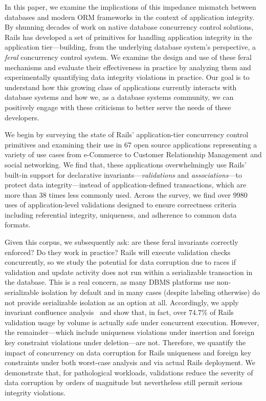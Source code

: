 In this paper, we examine the implications of this impedance mismatch
between databases and modern ORM frameworks in the context of
application integrity. By shunning decades of work on native database
concurrency control solutions, Rails has developed a set of primitives
for handling application integrity in the application tier---building,
from the underlying database system's perspective, a \textit{feral}
concurrency control system. We examine the design and use of these
feral mechanisms and evaluate their effectiveness in practice by
analyzing them and experimentally quantifying data integrity
violations in practice. Our goal is to understand how this growing
class of applications currently interacts with database systems and
how we, as a database systems community, we can positively engage with
these criticisms to better serve the needs of these developers.

We begin by surveying the state of Rails' application-tier concurrency
control primitives and examining their use in 67 open source
applications representing a variety of use cases from e-Commerce to
Customer Relationship Management and social networking. We find that,
these applications overwhelmingly use Rails' built-in support for
declarative invariants---\textit{validations} and
\textit{associations}---to protect data integrity---instead of
application-defined transactions, which are more than 38 times less
commonly used. Across the survey, we find over $9980$ uses of
application-level validations designed to ensure correctness criteria
including referential integrity, uniqueness, and adherence to common
data formats.

Given this corpus, we subsequently ask: are these feral invariants
correctly enforced? Do they work in practice? Rails will execute
validation checks concurrently, so we study the potential for data
corruption due to races if validation and update activity does not run
within a serializable transaction in the database. This is a real
concern, as many DBMS platforms use non-serializable isolation by
default and in many cases (despite labeling otherwise) do not provide
serializable isolation as an option at all.  Accordingly, we apply
invariant confluence analysis~\cite{coord-avoid} and show that, in
fact, over $74.7\%$ of Rails validation usage by volume is actually
safe under concurrent execution. However, the remainder---which
include uniqueness violations under insertion and foreign key
constraint violations under deletion---are not. Therefore, we quantify
the impact of concurrency on data corruption for Rails uniqueness and
foreign key constraints under both worst-case analysis and via actual
Rails deployment. We demonstrate that, for pathological workloads,
validations reduce the severity of data corruption by orders of
magnitude but nevertheless still permit serious integrity violations.

